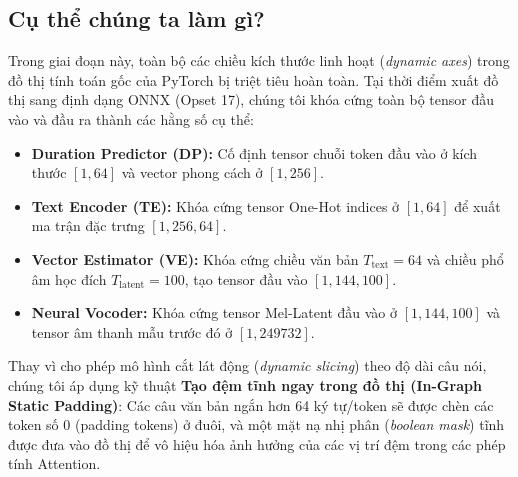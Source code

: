 \documentclass[11pt,a4paper,oneside,table]{report}
\begin{document}
\subsection{Cụ thể chúng ta làm gì?}
Trong giai đoạn này, toàn bộ các chiều kích thước linh hoạt (\textit{dynamic axes}) trong đồ thị tính toán gốc của PyTorch bị triệt tiêu hoàn toàn. Tại thời điểm xuất đồ thị sang định dạng ONNX (Opset 17), chúng tôi khóa cứng toàn bộ tensor đầu vào và đầu ra thành các hằng số cụ thể:
\begin{itemize}
    \item \textbf{Duration Predictor (DP):} Cố định tensor chuỗi token đầu vào ở kích thước $[1, 64]$ và vector phong cách ở $[1, 256]$.
    \item \textbf{Text Encoder (TE):} Khóa cứng tensor One-Hot indices ở $[1, 64]$ để xuất ma trận đặc trưng $[1, 256, 64]$.
    \item \textbf{Vector Estimator (VE):} Khóa cứng chiều văn bản $T_{\text{text}} = 64$ và chiều phổ âm học đích $T_{\text{latent}} = 100$, tạo tensor đầu vào $[1, 144, 100]$.
    \item \textbf{Neural Vocoder:} Khóa cứng tensor Mel-Latent đầu vào ở $[1, 144, 100]$ và tensor âm thanh mẫu trước đó ở $[1, 249732]$.
\end{itemize}

Thay vì cho phép mô hình cắt lát động (\textit{dynamic slicing}) theo độ dài câu nói, chúng tôi áp dụng kỹ thuật \textbf{Tạo đệm tĩnh ngay trong đồ thị (In-Graph Static Padding)}: Các câu văn bản ngắn hơn 64 ký tự/token sẽ được chèn các token số 0 (padding tokens) ở đuôi, và một mặt nạ nhị phân (\textit{boolean mask}) tĩnh được đưa vào đồ thị để vô hiệu hóa ảnh hưởng của các vị trí đệm trong các phép tính Attention.
\end{document}
